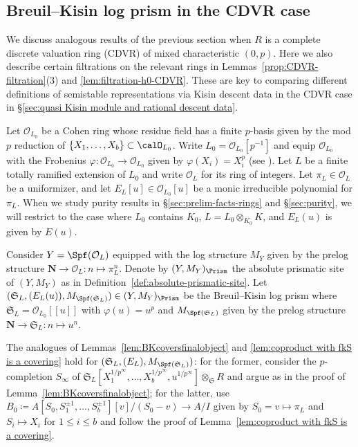 \subsection{Breuil--Kisin log prism in the CDVR case} \label{sec:CDVR-case-BK-prism-selfprod}

We discuss analogous results of the previous section when $R$ is a complete discrete valuation ring (CDVR) of mixed characteristic $(0, p)$. Here we also describe certain filtrations on the relevant rings in Lemmas~\ref{prop:CDVR-filtration}(3) and \ref{lem:filtration-h0-CDVR}. These are key to comparing different definitions of semistable representations via Kisin descent data in the CDVR case in \S\ref{sec:quasi Kisin module and rational descent data}.

Let $\mathcal{O}_{L_0}$ be a Cohen ring whose residue field has a finite $p$-basis given by the mod $p$ reduction of $\{X_1, \ldots, X_b\}\subset \calO_{L_0}$. Write $L_0 = \mathcal{O}_{L_0}[p^{-1}]$ and equip $\mathcal{O}_{L_0}$ with the Frobenius $\varphi\colon \mathcal{O}_{L_0} \rightarrow \mathcal{O}_{L_0}$ given by $\varphi(X_i) =X_i^p$ (see \cite[Cor.~1.2.7(ii)]{BM3}). Let $L$ be a finite totally ramified extension of $L_0$ and write $\mathcal{O}_L$ for its ring of integers. Let $\pi_L \in \mathcal{O}_L$ be a uniformizer, and let $E_L[u] \in \mathcal{O}_{L_0}[u]$ be a monic irreducible polynomial for $\pi_L$. When we study purity results in \S\ref{sec:prelim-facts-rings} and \S\ref{sec:purity}, we will restrict to the case where $L_0$ contains $K_0$, $L = L_0\otimes_{K_0} K$, and $E_L(u)$ is given by $E(u)$.   

Consider $Y = \Spf (\mathcal{O}_L)$ equipped with the log structure $M_Y$ given by the prelog structure $\mathbf{N} \rightarrow \mathcal{O}_L: n \mapsto \pi_L^n$. Denote by $(Y, M_Y)_{\Prism}$ the absolute prismatic site of $(Y, M_Y)$ as in Definition~\ref{def:absolute-prismatic-site}. Let $(\mathfrak{S}_L, (E_L(u)), M_{\Spf (\mathfrak{S}_L)}) \in (Y, M_Y)_{\Prism}$ be the Breuil--Kisin log prism where $\mathfrak{S}_L = \mathcal{O}_{L_0}[\![u]\!]$ with $\varphi(u) = u^p$ and $M_{\Spf (\mathfrak{S}_L)}$ given by the prelog structure $\mathbf{N} \rightarrow \mathfrak{S}_L: n \mapsto u^n$. 

\begin{rem}
The analogues of Lemmas~\ref{lem:BKcoversfinalobject} and \ref{lem:coproduct with fkS is a covering} hold for $(\mathfrak{S}_L, (E_L), M_{\Spf (\mathfrak{S}_L)})$: for the former, consider the $p$-completion $S_{\infty}$ of $\mathfrak{S}_L[X_1^{1/p^{\infty}}, \ldots, X_b^{1/p^{\infty}}, u^{1/p^{\infty}}]\otimes_{\mathfrak{S}} R$ and argue as in the proof of Lemma~\ref{lem:BKcoversfinalobject}; for the latter,  use $B_0 \coloneqq A[S_0, S_1^{\pm 1}, \ldots, S_b^{\pm 1}][v]/(S_0-v)\rightarrow A/I$ given by $S_0 = v \mapsto \pi_L$ and $S_i \mapsto X_i$ for $1 \leq i \leq b$ and follow the proof of Lemma~\ref{lem:coproduct with fkS is a covering}.   
\end{rem}

